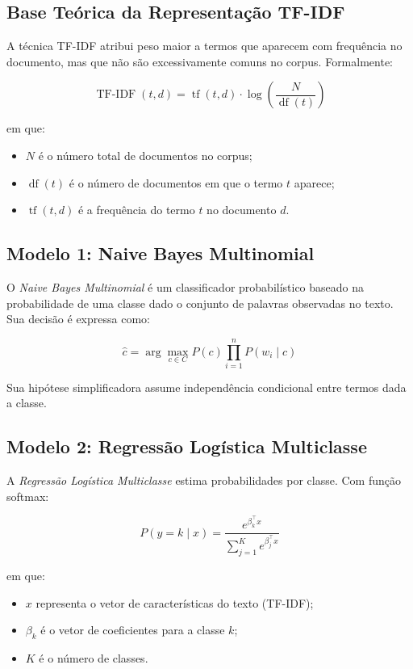 \documentclass[12pt,a4paper]{article}
\begin{document}
\subsection{Base Teórica da Representação TF-IDF}

A técnica TF-IDF atribui peso maior a termos que aparecem com frequência no documento, mas que não são excessivamente comuns no corpus. Formalmente:

\[
\operatorname{TF\mbox{-}IDF}(t,d) = \operatorname{tf}(t,d)\cdot \log\left(\frac{N}{\operatorname{df}(t)}\right)
\]

em que:
\begin{itemize}[leftmargin=1.2cm]
    \item $N$ é o número total de documentos no corpus;
    \item $\operatorname{df}(t)$ é o número de documentos em que o termo $t$ aparece;
    \item $\operatorname{tf}(t,d)$ é a frequência do termo $t$ no documento $d$.
\end{itemize}

\subsection{Modelo 1: Naive Bayes Multinomial}

O \textit{Naive Bayes Multinomial} é um classificador probabilístico baseado na probabilidade de uma classe dado o conjunto de palavras observadas no texto. Sua decisão é expressa como:

\[
\hat{c} = \arg\max_{c \in C} P(c)\prod_{i=1}^{n}P(w_i \mid c)
\]

Sua hipótese simplificadora assume independência condicional entre termos dada a classe.

\subsection{Modelo 2: Regressão Logística Multiclasse}

A \textit{Regressão Logística Multiclasse} estima probabilidades por classe. Com função softmax:

\[
P(y = k \mid x) = \frac{e^{\beta_k^\top x}}{\sum_{j=1}^{K} e^{\beta_j^\top x}}
\]

em que:
\begin{itemize}[leftmargin=1.2cm]
    \item $x$ representa o vetor de características do texto (TF-IDF);
    \item $\beta_k$ é o vetor de coeficientes para a classe $k$;
    \item $K$ é o número de classes.
\end{itemize}
\end{document}
